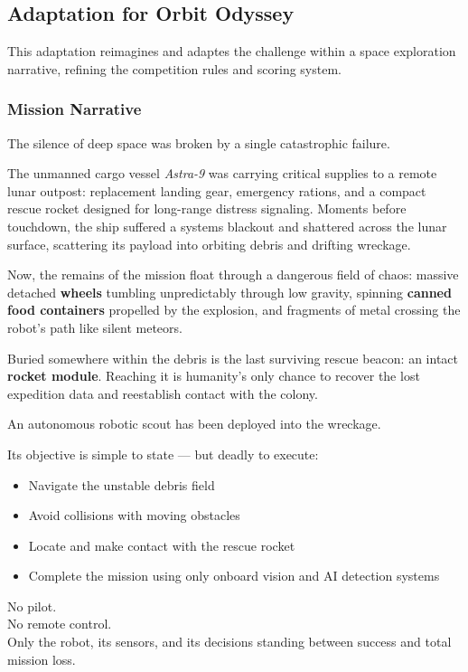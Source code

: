 \documentclass[11pt,a4paper]{article}
\begin{document}
\subsection{Adaptation for Orbit Odyssey}

This adaptation reimagines and adaptes the challenge within a space exploration narrative, refining the competition rules and scoring system.

\subsubsection*{Mission Narrative}

The silence of deep space was broken by a single catastrophic failure.

The unmanned cargo vessel \textit{Astra-9} was carrying critical supplies to a remote lunar outpost: replacement landing gear, emergency rations, and a compact rescue rocket designed for long-range distress signaling. Moments before touchdown, the ship suffered a systems blackout and shattered across the lunar surface, scattering its payload into orbiting debris and drifting wreckage.

Now, the remains of the mission float through a dangerous field of chaos: massive detached \textbf{wheels} tumbling unpredictably through low gravity, spinning \textbf{canned food containers} propelled by the explosion, and fragments of metal crossing the robot's path like silent meteors.

Buried somewhere within the debris is the last surviving rescue beacon: an intact \textbf{rocket module}. Reaching it is humanity's only chance to recover the lost expedition data and reestablish contact with the colony.

An autonomous robotic scout has been deployed into the wreckage.

Its objective is simple to state --- but deadly to execute:

\begin{itemize}
    \item Navigate the unstable debris field
    \item Avoid collisions with moving obstacles
    \item Locate and make contact with the rescue rocket
    \item Complete the mission using only onboard vision and AI detection systems
\end{itemize}

No pilot.\\
No remote control.\\
Only the robot, its sensors, and its decisions standing between success and total mission loss.
\end{document}
